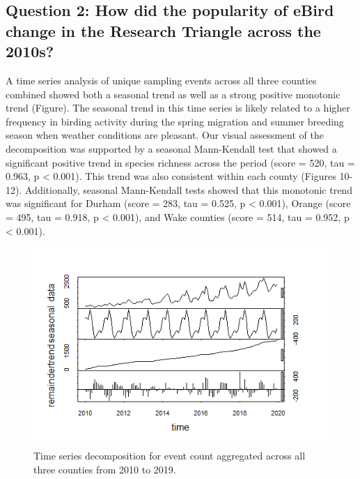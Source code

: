 \documentclass[
  12pt,
]{article}
\begin{document}
\hypertarget{question-2-how-did-the-popularity-of-ebird-change-in-the-research-triangle-across-the-2010s}{%
\subsection{Question 2: How did the popularity of eBird change in the
Research Triangle across the
2010s?}\label{question-2-how-did-the-popularity-of-ebird-change-in-the-research-triangle-across-the-2010s}}

A time series analysis of unique sampling events across all three
counties combined showed both a seasonal trend as well as a strong
positive monotonic trend (Figure). The seasonal trend in this time
series is likely related to a higher frequency in birding activity
during the spring migration and summer breeding season when weather
conditions are pleasant. Our visual assessment of the decomposition was
supported by a seasonal Mann-Kendall test that showed a significant
positive trend in species richness across the period (score = 520, tau =
0.963, p \textless{} 0.001). This trend was also consistent within each
county (Figures 10-12). Additionally, seasonal Mann-Kendall tests showed
that this monotonic trend was significant for Durham (score = 283, tau =
0.525, p \textless{} 0.001), Orange (score = 495, tau = 0.918, p
\textless{} 0.001), and Wake counties (score = 514, tau = 0.952, p
\textless{} 0.001).

\begin{figure}
\centering
\includegraphics{./Output/RT_event_ts_decomp.png}
\caption{Time series decomposition for event count aggregated across all
three counties from 2010 to 2019.}
\end{figure}
\end{document}

